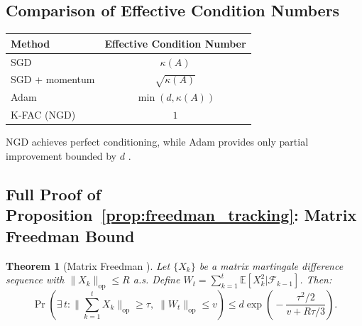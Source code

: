\documentclass{article}
\providecommand{\E}{\mathbb{E}}
\providecommand{\norm}[1]{\lVert #1 \rVert}
\theoremstyle{plain}
\newtheorem{theorem}{Theorem}
\theoremstyle{definition}
\theoremstyle{remark}
\begin{document}
\subsection{Comparison of Effective Condition Numbers}

\begin{center}
\begin{tabular}{lc}
\toprule
\textbf{Method} & \textbf{Effective Condition Number} \\
\midrule
SGD & $\kappa(A)$ \\
SGD + momentum & $\sqrt{\kappa(A)}$ \\
Adam & $\min(d, \kappa(A))$ \\
K-FAC (NGD) & $1$ \\
\bottomrule
\end{tabular}
\end{center}

NGD achieves perfect conditioning, while Adam provides only partial improvement bounded by $d$ \citep{lin2024sqrt}.

\subsection{Full Proof of Proposition~\ref{prop:freedman_tracking}: Matrix Freedman Bound}

\begin{theorem}[Matrix Freedman {\citep{tropp2011freedman}}]
\label{thm:freedman_app}
Let $\{X_k\}$ be a matrix martingale difference sequence with $\norm{X_k}_{\mathrm{op}} \leq R$ a.s. Define $W_t = \sum_{k=1}^t \E[X_k^2 | \mathcal{F}_{k-1}]$. Then:
\begin{equation}
    \Pr\!\left(\exists\, t: \norm{\textstyle\sum_{k=1}^t X_k}_{\mathrm{op}} \!\geq\! \tau,\; \norm{W_t}_{\mathrm{op}} \!\leq\! v\right) \leq d\exp\!\left(\!-\frac{\tau^2/2}{v + R\tau/3}\right).
\end{equation}
\end{theorem}
\end{document}
